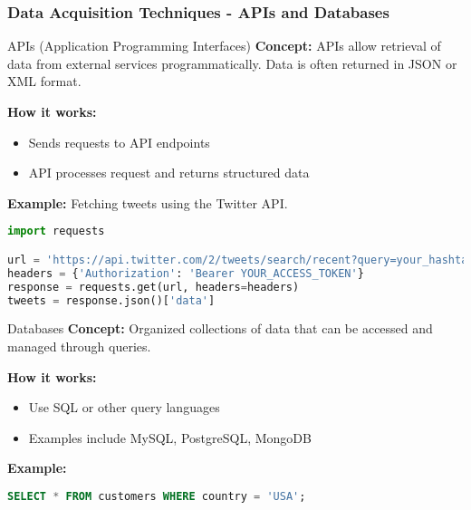 \documentclass[aspectratio=169]{beamer}
\begin{document}
\begin{frame}[fragile]
    \frametitle{Data Acquisition Techniques - APIs and Databases}
    \begin{block}{APIs (Application Programming Interfaces)}
        \textbf{Concept:} APIs allow retrieval of data from external services programmatically. Data is often returned in JSON or XML format.
        
        \textbf{How it works:}
        \begin{itemize}
            \item Sends requests to API endpoints
            \item API processes request and returns structured data
        \end{itemize}
        
        \textbf{Example:} Fetching tweets using the Twitter API.
    \end{block}

    \begin{lstlisting}[language=Python]
import requests

url = 'https://api.twitter.com/2/tweets/search/recent?query=your_hashtag'
headers = {'Authorization': 'Bearer YOUR_ACCESS_TOKEN'}
response = requests.get(url, headers=headers)
tweets = response.json()['data']
    \end{lstlisting}
    
    \begin{block}{Databases}
        \textbf{Concept:} Organized collections of data that can be accessed and managed through queries.
        
        \textbf{How it works:}
        \begin{itemize}
            \item Use SQL or other query languages
            \item Examples include MySQL, PostgreSQL, MongoDB
        \end{itemize}
        
        \textbf{Example:}
        \begin{lstlisting}[language=SQL]
SELECT * FROM customers WHERE country = 'USA';
        \end{lstlisting}
    \end{block}
\end{frame}
\end{document}
